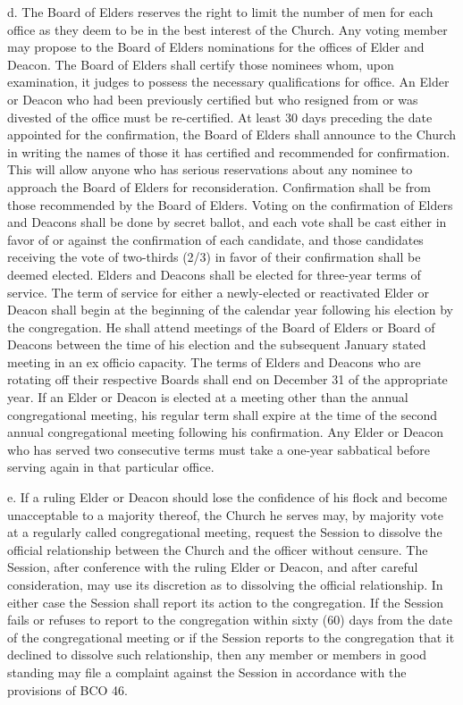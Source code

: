 \documentclass[
]{book}
\begin{document}
d. The Board of Elders reserves the right to limit the number of men for each office as they deem to be in the best interest of the Church. Any voting member may propose to the Board of Elders nominations for the offices of Elder and Deacon. The Board of Elders shall certify those nominees whom, upon examination, it judges to possess the neces­sary qualifications for office. An Elder or Deacon who had been previously certified but who resigned from or was divested of the office must be re-certified. At least 30 days preceding the date appointed for the confirmation, the Board of Elders shall announce to the Church in writing the names of those it has certified and recommended for confirmation. This will allow anyone who has serious reservations about any nominee to approach the Board of Elders for reconsideration. Confirmation shall be from those recommended by the Board of Elders­. Vot­ing on the confirmation of Elders and Deacons shall be done by secret ballot, and each vote shall be cast either in favor of or against the confirmation of each candidate, and those candidates receiving the vote of two-thirds (2/3) in favor of their confirmation shall be deemed elected. Elders and Deacons shall be elected for three-year terms of service. The term of service for either a newly-elected or reactivated Elder or Deacon shall begin at the beginning of the calendar year following his election by the congregation. He shall attend meetings of the Board of Elders or Board of Deacons between the time of his election and the subsequent January stated meeting in an ex officio capacity. The terms of Elders and Deacons who are rotating off their respective Boards shall end on December 31 of the appropriate year. If an Elder or Deacon is elected at a meeting other than the annual congregational meet­ing, his regular term shall expire at the time of the second annual congregational meeting following his confirmation. Any Elder or Deacon who has served two consecutive terms must take a one-year sabbatical before serving again in that particular office.

e. If a ruling Elder or Deacon should lose the confidence of his flock and become unacceptable to a majority thereof, the Church he serves may, by majority vote at a regularly called congregational meeting, request the Session to dissolve the official relationship between the Church and the officer without censure. The Session, after conference with the ruling Elder or Deacon, and after careful consideration, may use its discretion as to dissolving the official relationship. In either case the Session shall report its action to the congregation. If the Session fails or refuses to report to the congregation within sixty (60) days from the date of the congregational meeting or if the Session reports to the congregation that it declined to dissolve such relationship, then any member or members in good standing may file a complaint against the Session in accordance with the provisions of BCO 46.
\end{document}
